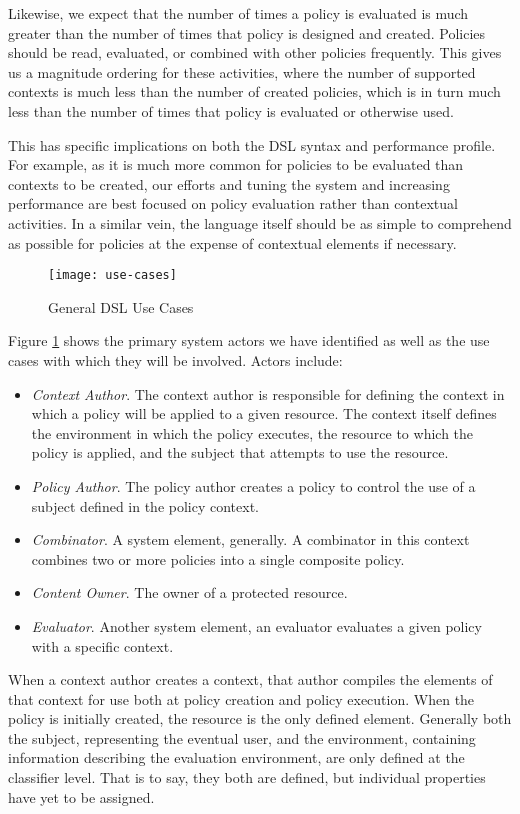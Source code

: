 Likewise, we expect that the number of times a policy is evaluated is much greater than the number of times that policy is designed and created.  Policies should be read, evaluated, or combined with other policies frequently.  This gives us a magnitude ordering for these activities, where the number of supported contexts is much less than the number of created policies, which is in turn much less than the number of times that policy is evaluated or otherwise used.

This has specific implications on both the DSL syntax and performance profile.  For example, as it is much more common for policies to be evaluated than contexts to be created, our efforts and tuning the system and increasing performance are best focused on policy evaluation rather than contextual activities.  In a similar vein, the language itself should be as simple to comprehend as possible for policies at the expense of contextual elements if necessary.

\begin{figure}[!t]
\centering
\texttt{[image: use-cases]}
\caption{General DSL Use Cases}
\label{fig:model:use-cases}
\end{figure}

Figure \ref{fig:model:use-cases} shows the primary system actors we have identified as well as the use cases with which they will be involved.  Actors include:
\begin{itemize}
\item \textit{Context Author}.  The context author is responsible for defining the context in which a policy will be applied to a given resource.  The context itself defines the environment in which the policy executes, the resource to which the policy is applied, and the subject that attempts to use the resource.
\item \textit{Policy Author}.  The policy author creates a policy to control the use of a subject defined in the policy context.
\item \textit{Combinator}. A system element, generally.  A combinator in this context combines two or more policies into a single composite policy.
\item \textit{Content Owner}.  The owner of a protected resource.
\item \textit{Evaluator}. Another system element, an evaluator evaluates a given policy with a specific context.
\end{itemize}

When a context author creates a context, that author compiles the elements of that context for use both at policy creation and policy execution.  When the policy is initially created, the resource is the only defined element.  Generally both the subject, representing the eventual user, and the environment, containing information describing the evaluation environment, are only defined at the classifier level.  That is to say, they both are defined, but individual properties have yet to be assigned.

